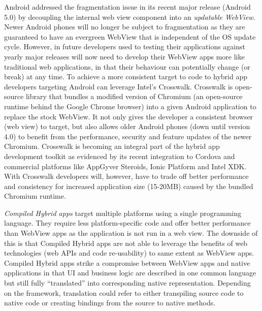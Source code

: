 \documentclass[thesis.tex]{subfiles}
\begin{document}
Android addressed the fragmentation issue in its recent major release (Android 5.0) by decoupling the internal web view component into an \textit{updatable WebView}. Newer Android phones will no longer be subject to fragmentation as they are guaranteed to have an evergreen WebView that is independent of the OS update cycle. However, in future developers used to testing their applications against yearly major releases will now need to develop their WebView apps more like traditional web applications, in that their behaviour can potentially change (or break) at any time. To achieve a more consistent target to code to hybrid app developers targeting Android can leverage Intel's Crosswalk. Crosswalk is open-source library that bundles a modified version of Chromium (an open-source runtime behind the Google Chrome browser) into a given Android application to replace the stock WebView. It not only gives the developer a consistent browser (web view) to target, but also allows older Android phones (down until version 4.0) to benefit from the performance, security and feature updates of the newer Chromium. Crosswalk is becoming an integral part of the hybrid app development toolkit as evidenced by its recent integration to Cordova and commercial platforms like AppGyver Steroids, Ionic Platform and Intel XDK. With Crosswalk developers will, however, have to trade off better performance and consistency for increased application size (15-20MB) caused by the bundled Chromium runtime.

\textit{Compiled Hybrid apps} target multiple platforms using a single programming language. They require less platform-specific code and offer better performance than WebView apps as the application is not run in a web view. The downside of this is that Compiled Hybrid apps are not able to leverage the benefits of web technologies (web APIs and code re-usability) to same extent as WebView apps. Compiled Hybrid apps strike a compromise between WebView apps and native applications in that UI and business logic are described in one common language but still fully ``translated'' into corresponding native representation. Depending on the framework, translation could refer to either transpiling source code to native code or creating bindings from the source to native methods.
\end{document}
